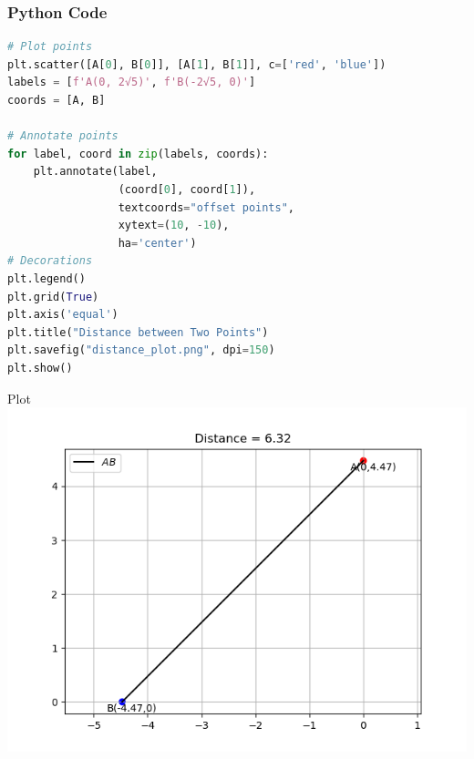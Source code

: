 \documentclass{beamer}
\begin{document}
\begin{frame}[fragile]
    \frametitle{Python Code}
    \begin{lstlisting}[language=Python]
# Plot points
plt.scatter([A[0], B[0]], [A[1], B[1]], c=['red', 'blue'])
labels = [f'A(0, 2√5)', f'B(-2√5, 0)']
coords = [A, B]

# Annotate points
for label, coord in zip(labels, coords):
    plt.annotate(label,
                 (coord[0], coord[1]),
                 textcoords="offset points",
                 xytext=(10, -10),
                 ha='center')
# Decorations
plt.legend()
plt.grid(True)
plt.axis('equal')
plt.title("Distance between Two Points")
plt.savefig("distance_plot.png", dpi=150)
plt.show()
    \end{lstlisting}
\end{frame}

\begin{frame}{Plot}
    \centering
    \includegraphics[width=0.8\columnwidth]{beamer/figs/Figure_1.png}     
\end{frame}
\end{document}

